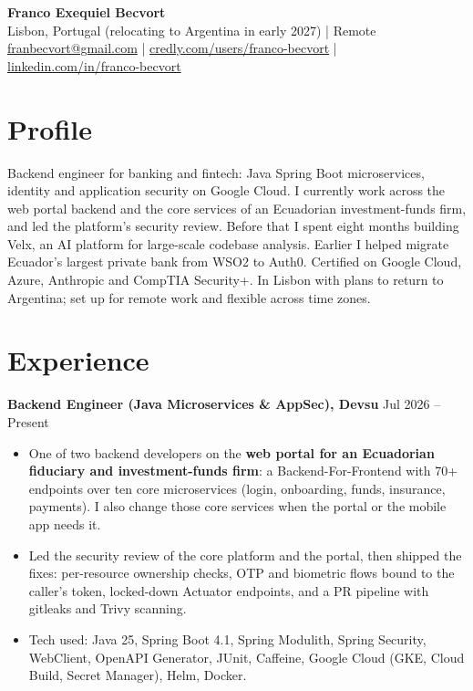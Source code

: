 \documentclass[10pt, a4paper]{article}
\begin{document}
\begin{center}
    {\LARGE\bfseries Franco Exequiel Becvort} \\
    Lisbon, Portugal (relocating to Argentina in early 2027) | Remote \\
    \href{mailto:franbecvort@gmail.com}{franbecvort@gmail.com} |
    \href{https://credly.com/users/franco-becvort}{credly.com/users/franco-becvort} |
    \href{https://linkedin.com/in/franco-becvort}{linkedin.com/in/franco-becvort} \\
\end{center}

\vspace{5pt}

\section{Profile}
Backend engineer for banking and fintech: Java Spring Boot microservices, identity and application security on Google Cloud. I currently work across the web portal backend and the core services of an Ecuadorian investment-funds firm, and led the platform's security review. Before that I spent eight months building Velx, an AI platform for large-scale codebase analysis. Earlier I helped migrate Ecuador's largest private bank from WSO2 to Auth0. Certified on Google Cloud, Azure, Anthropic and CompTIA Security+. In Lisbon with plans to return to Argentina; set up for remote work and flexible across time zones.

\section{Experience}
\textbf{Backend Engineer (Java Microservices \& AppSec), Devsu} \hfill Jul 2026 -- Present
\begin{itemize}[leftmargin=10pt, noitemsep]
    \item One of two backend developers on the \textbf{web portal for an Ecuadorian fiduciary and investment-funds firm}: a Backend-For-Frontend with 70+ endpoints over ten core microservices (login, onboarding, funds, insurance, payments). I also change those core services when the portal or the mobile app needs it.
    \item Led the security review of the core platform and the portal, then shipped the fixes: per-resource ownership checks, OTP and biometric flows bound to the caller's token, locked-down Actuator endpoints, and a PR pipeline with gitleaks and Trivy scanning.
    \item Tech used: Java 25, Spring Boot 4.1, Spring Modulith, Spring Security, WebClient, OpenAPI Generator, JUnit, Caffeine, Google Cloud (GKE, Cloud Build, Secret Manager), Helm, Docker.
\end{itemize}
\end{document}
